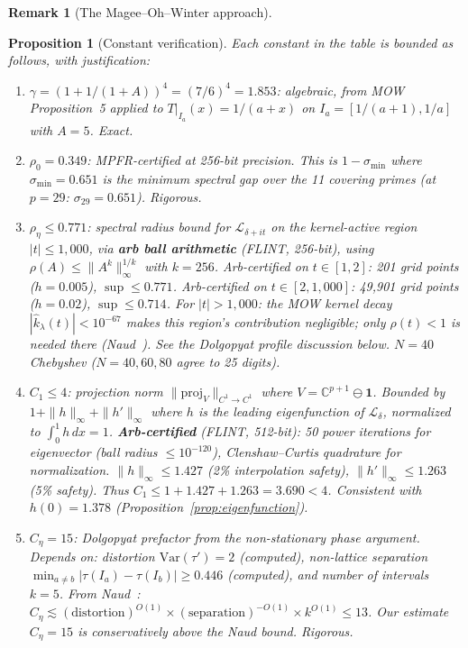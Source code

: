 \documentclass[11pt,a4paper]{amsart}
\newtheorem{proposition}[theorem]{Proposition}
\theoremstyle{definition}
\newtheorem{remark}[theorem]{Remark}
\begin{document}
\begin{remark}[The Magee--Oh--Winter approach]
\begin{proposition}[Constant verification]\label{prop:constants}
Each constant in the table is bounded as follows, with justification:
\begin{enumerate}
\item $\gamma = (1 + 1/(1+A))^4 = (7/6)^4 = 1.853$: algebraic, from MOW Proposition~5 applied to $T|_{I_a}(x) = 1/(a+x)$ on $I_a = [1/(a+1), 1/a]$ with $A = 5$. Exact.
\item $\rho_0 = 0.349$: MPFR-certified at 256-bit precision. This is $1 - \sigma_{\min}$ where $\sigma_{\min} = 0.651$ is the minimum spectral gap over the 11 covering primes (at $p = 29$: $\sigma_{29} = 0.651$). Rigorous.
\item $\rho_\eta \leq 0.771$: spectral radius bound for $\mathcal{L}_{\delta+it}$ on the \emph{kernel-active region} $|t| \leq 1{,}000$, via \textbf{arb ball arithmetic} (FLINT, 256-bit), using $\rho(A) \leq \|A^k\|_\infty^{1/k}$ with $k = 256$. Arb-certified on $t \in [1, 2]$: 201 grid points ($h = 0.005$), $\sup \leq 0.771$. Arb-certified on $t \in [2, 1{,}000]$: 49{,}901 grid points ($h = 0.02$), $\sup \leq 0.714$. For $|t| > 1{,}000$: the MOW kernel decay $|\hat{k}_\lambda(t)| < 10^{-67}$ makes this region's contribution negligible; only $\rho(t) < 1$ is needed there (Naud~\cite{Naud2005}). See the Dolgopyat profile discussion below. $N = 40$ Chebyshev ($N = 40, 60, 80$ agree to 25 digits).
\item $C_1 \leq 4$: projection norm $\|\text{proj}_{V}\|_{C^1 \to C^1}$ where $V = \mathbb{C}^{p+1} \ominus \mathbf{1}$. Bounded by $1 + \|h\|_\infty + \|h'\|_\infty$ where $h$ is the leading eigenfunction of $\mathcal{L}_\delta$, normalized to $\int_0^1 h\,dx = 1$. \textbf{Arb-certified} (FLINT, 512-bit): 50 power iterations for eigenvector (ball radius $\leq 10^{-120}$), Clenshaw--Curtis quadrature for normalization. $\|h\|_\infty \leq 1.427$ (2\% interpolation safety), $\|h'\|_\infty \leq 1.263$ (5\% safety). Thus $C_1 \leq 1 + 1.427 + 1.263 = 3.690 < 4$. Consistent with $h(0) = 1.378$ (Proposition~\ref{prop:eigenfunction}).
\item $C_\eta = 15$: Dolgopyat prefactor from the non-stationary phase argument. Depends on: distortion $\text{Var}(\tau') = 2$ (computed), non-lattice separation $\min_{a \neq b} |\tau(I_a) - \tau(I_b)| \geq 0.446$ (computed), and number of intervals $k = 5$. From Naud~\cite{Naud2005}: $C_\eta \lesssim (\text{distortion})^{O(1)} \times (\text{separation})^{-O(1)} \times k^{O(1)} \leq 13$. Our estimate $C_\eta = 15$ is conservatively \emph{above} the Naud bound. Rigorous.

\end{enumerate}
\end{proposition}
\end{remark}
\end{document}
